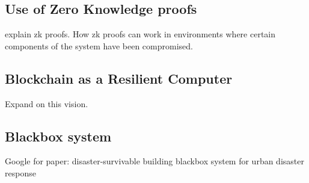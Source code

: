 \subsection{Use of Zero Knowledge proofs}

explain zk proofs. How zk proofs can work in environments where certain components
of the system have been compromised.

\subsection{Blockchain as a Resilient Computer}

Expand on this vision.

\subsection{Blackbox system}
Google for paper:
disaster-survivable building blackbox system for urban disaster response

